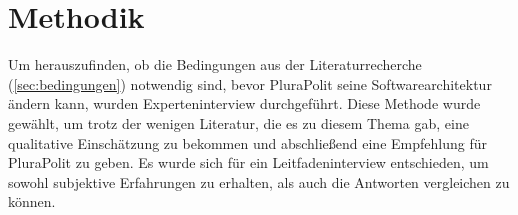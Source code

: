 \section{Methodik}
\label{sec:methodik}

Um herauszufinden, ob die Bedingungen aus der Literaturrecherche (\cref{sec:bedingungen}) notwendig sind, bevor PluraPolit seine Softwarearchitektur ändern kann, wurden Experteninterview durchgeführt. Diese Methode wurde gewählt, um trotz der wenigen Literatur, die es zu diesem Thema gab, eine qualitative Einschätzung zu bekommen und abschließend eine Empfehlung für PluraPolit zu geben. Es wurde sich für ein Leitfadeninterview entschieden, um sowohl subjektive Erfahrungen zu erhalten, als auch die Antworten vergleichen zu können.










